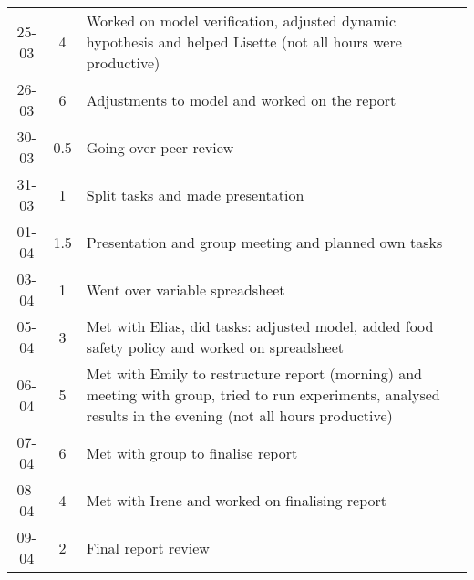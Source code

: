 \begin{longtable}[c]{c|c|m{35em}}
25-03 & 4 & Worked on model verification, adjusted dynamic hypothesis and helped Lisette (not all hours were productive) \\ 
26-03 & 6 & Adjustments to model and worked on the report \\ 
30-03 & 0.5 & Going over peer review \\
31-03 & 1 & Split tasks and made presentation \\
01-04 & 1.5 & Presentation and group meeting and planned own tasks \\ 
03-04 & 1 & Went over variable spreadsheet \\ 
05-04 & 3 & Met with Elias, did tasks: adjusted model, added food safety policy and worked on spreadsheet \\ 
06-04 & 5 & Met with Emily to restructure report (morning) and meeting with group, tried to run experiments, analysed results in the evening (not all hours productive) \\
07-04 & 6 & Met with group to finalise report \\ 
08-04 & 4 & Met with Irene and worked on finalising report \\ 
09-04 & 2 & Final report review \\ 
\end{longtable}


